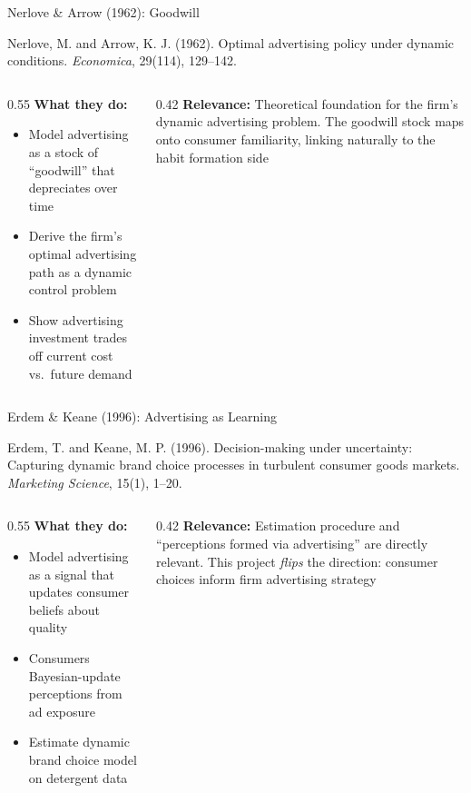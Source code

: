 \documentclass[aspectratio=169,professionalfonts]{beamer}
\newcommand{\hl}[1]{\textbf{\textcolor{UGARed}{#1}}}
\begin{document}
\begin{frame}{Nerlove \& Arrow (1962): Goodwill}
  \begin{tcolorbox}[colback=red!5!white, colframe=UGARed, title=\textbf{Citation}]
    Nerlove, M. and Arrow, K. J. (1962). Optimal advertising policy under dynamic
    conditions. \textit{Economica}, 29(114), 129--142.
  \end{tcolorbox}
  \vspace{6pt}
  \begin{columns}[T]
    \begin{column}{0.55\textwidth}
      \hl{What they do:}
      \begin{itemize}
        \item Model advertising as a stock of ``goodwill'' that depreciates over time
        \item Derive the firm's optimal advertising path as a dynamic control problem
        \item Show advertising investment trades off current cost vs.\ future demand
      \end{itemize}
    \end{column}
    \begin{column}{0.42\textwidth}
      \hl{Relevance:} Theoretical foundation for the firm's dynamic advertising problem.
      The goodwill stock maps onto consumer familiarity, linking naturally to the
      habit formation side
    \end{column}
  \end{columns}
\end{frame}

\begin{frame}{Erdem \& Keane (1996): Advertising as Learning}
  \begin{tcolorbox}[colback=red!5!white, colframe=UGARed, title=\textbf{Citation}]
    Erdem, T. and Keane, M. P. (1996). Decision-making under uncertainty: Capturing
    dynamic brand choice processes in turbulent consumer goods markets.
    \textit{Marketing Science}, 15(1), 1--20.
  \end{tcolorbox}
  \vspace{6pt}
  \begin{columns}[T]
    \begin{column}{0.55\textwidth}
      \hl{What they do:}
      \begin{itemize}
        \item Model advertising as a signal that updates consumer beliefs about quality
        \item Consumers Bayesian-update perceptions from ad exposure
        \item Estimate dynamic brand choice model on detergent data
      \end{itemize}
    \end{column}
    \begin{column}{0.42\textwidth}
      \hl{Relevance:} Estimation procedure and ``perceptions formed via advertising'' are
      directly relevant. This project \emph{flips} the direction: consumer choices inform
      firm advertising strategy
    \end{column}
  \end{columns}
\end{frame}
\end{document}
